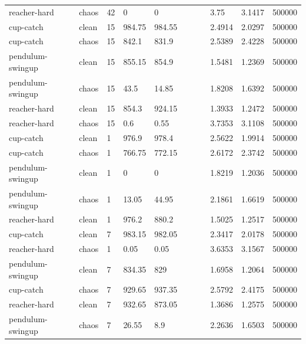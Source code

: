 \begin{tabular}{lllllllllll}
reacher-hard & chaos & 42 & 0 & 0 &  &  &  & 3.75 & 3.1417 & 500000 \\
cup-catch & clean & 15 & 984.75 & 984.55 &  &  &  & 2.4914 & 2.0297 & 500000 \\
cup-catch & chaos & 15 & 842.1 & 831.9 &  &  &  & 2.5389 & 2.4228 & 500000 \\
pendulum-swingup & clean & 15 & 855.15 & 854.9 &  &  &  & 1.5481 & 1.2369 & 500000 \\
pendulum-swingup & chaos & 15 & 43.5 & 14.85 &  &  &  & 1.8208 & 1.6392 & 500000 \\
reacher-hard & clean & 15 & 854.3 & 924.15 &  &  &  & 1.3933 & 1.2472 & 500000 \\
reacher-hard & chaos & 15 & 0.6 & 0.55 &  &  &  & 3.7353 & 3.1108 & 500000 \\
cup-catch & clean & 1 & 976.9 & 978.4 &  &  &  & 2.5622 & 1.9914 & 500000 \\
cup-catch & chaos & 1 & 766.75 & 772.15 &  &  &  & 2.6172 & 2.3742 & 500000 \\
pendulum-swingup & clean & 1 & 0 & 0 &  &  &  & 1.8219 & 1.2036 & 500000 \\
pendulum-swingup & chaos & 1 & 13.05 & 44.95 &  &  &  & 2.1861 & 1.6619 & 500000 \\
reacher-hard & clean & 1 & 976.2 & 880.2 &  &  &  & 1.5025 & 1.2517 & 500000 \\
cup-catch & clean & 7 & 983.15 & 982.05 &  &  &  & 2.3417 & 2.0178 & 500000 \\
reacher-hard & chaos & 1 & 0.05 & 0.05 &  &  &  & 3.6353 & 3.1567 & 500000 \\
pendulum-swingup & clean & 7 & 834.35 & 829 &  &  &  & 1.6958 & 1.2064 & 500000 \\
cup-catch & chaos & 7 & 929.65 & 937.35 &  &  &  & 2.5792 & 2.4175 & 500000 \\
reacher-hard & clean & 7 & 932.65 & 873.05 &  &  &  & 1.3686 & 1.2575 & 500000 \\
pendulum-swingup & chaos & 7 & 26.55 & 8.9 &  &  &  & 2.2636 & 1.6503 & 500000 \\
\bottomrule
\end{tabular}
